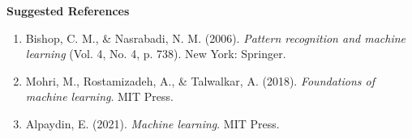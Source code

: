 \documentclass[a4paper,10pt]{article}
\begin{document}
\vspace{1em}

\noindent \textbf{Suggested References}
\begin{enumerate}
    \item Bishop, C. M., \& Nasrabadi, N. M. (2006). \textit{Pattern recognition and machine learning} (Vol. 4, No. 4, p. 738). New York: Springer.
    \item Mohri, M., Rostamizadeh, A., \& Talwalkar, A. (2018). \textit{Foundations of machine learning}. MIT Press.
    \item Alpaydin, E. (2021). \textit{Machine learning}. MIT Press.
\end{enumerate}
\end{document}
